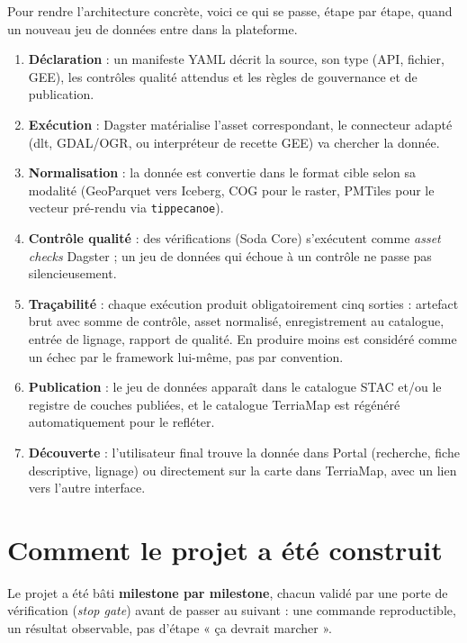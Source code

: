 \documentclass[11pt,a4paper]{article}
\begin{document}
Pour rendre l'architecture concrète, voici ce qui se passe, étape par étape, quand un nouveau jeu de données entre dans la plateforme.

\begin{enumerate}[leftmargin=1.4em, itemsep=5pt, label=\headingfont\bfseries\color{navy}\arabic*.]
\item \textbf{Déclaration} : un manifeste YAML décrit la source, son type (API, fichier, GEE), les contrôles qualité attendus et les règles de gouvernance et de publication.
\item \textbf{Exécution} : Dagster matérialise l'asset correspondant, le connecteur adapté (dlt, GDAL/OGR, ou interpréteur de recette GEE) va chercher la donnée.
\item \textbf{Normalisation} : la donnée est convertie dans le format cible selon sa modalité (GeoParquet vers Iceberg, COG pour le raster, PMTiles pour le vecteur pré-rendu via \texttt{tippecanoe}).
\item \textbf{Contrôle qualité} : des vérifications (Soda Core) s'exécutent comme \emph{asset checks} Dagster ; un jeu de données qui échoue à un contrôle ne passe pas silencieusement.
\item \textbf{Traçabilité} : chaque exécution produit obligatoirement cinq sorties : artefact brut avec somme de contrôle, asset normalisé, enregistrement au catalogue, entrée de lignage, rapport de qualité. En produire moins est considéré comme un échec par le framework lui-même, pas par convention.
\item \textbf{Publication} : le jeu de données apparaît dans le catalogue STAC et/ou le registre de couches publiées, et le catalogue TerriaMap est régénéré automatiquement pour le refléter.
\item \textbf{Découverte} : l'utilisateur final trouve la donnée dans Portal (recherche, fiche descriptive, lignage) ou directement sur la carte dans TerriaMap, avec un lien vers l'autre interface.
\end{enumerate}

\clearpage

\section{Comment le projet a été construit}

Le projet a été bâti \textbf{milestone par milestone}, chacun validé par une porte de vérification (\emph{stop gate}) avant de passer au suivant : une commande reproductible, un résultat observable, pas d'étape « ça devrait marcher ».
\end{document}
